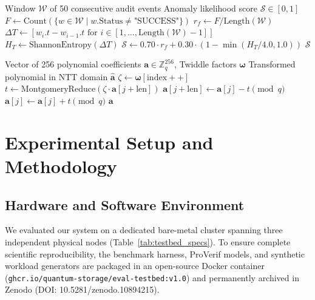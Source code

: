 \documentclass[sn-mathphys,Numbered]{sn-jnl}%
\theoremstyle{thmstyleone}%
\theoremstyle{thmstyletwo}%
\theoremstyle{thmstylethree}%
\begin{document}
\begin{algorithm}[!htbp]
\caption{Sliding-Window Bayesian Anomaly Classification Routine}
\label{alg:anomaly}
\begin{algorithmic}[1]
\Require Window $\mathcal{W}$ of 50 consecutive audit events
\Ensure Anomaly likelihood score $\mathcal{S} \in [0, 1]$
\State $F \gets \text{Count}(\{w \in \mathcal{W} \mid w.\text{Status} \neq \text{"SUCCESS"}\})$
\State $r_f \gets F / \text{Length}(\mathcal{W})$
\State $\Delta T \gets [w_i.t - w_{i-1}.t \text{ for } i \in [1, \dots, \text{Length}(\mathcal{W})-1]]$
\State $H_T \gets \text{ShannonEntropy}(\Delta T)$
\State $\mathcal{S} \gets 0.70 \cdot r_f + 0.30 \cdot (1 - \min(H_T / 4.0, 1.0))$
\State \Return $\mathcal{S}$
\end{algorithmic}
\end{algorithm}

\begin{algorithm}[!htbp]
\caption{Vectorized NTT Modular Butterfly Reduction over $R_q$}
\label{alg:ntt}
\begin{algorithmic}[1]
\Require Vector of 256 polynomial coefficients $\mathbf{a} \in \mathbb{Z}_q^{256}$, Twiddle factors $\boldsymbol{\omega}$
\Ensure Transformed polynomial in NTT domain $\hat{\mathbf{a}}$
        \State $\zeta \gets \boldsymbol{\omega}[\text{index}++]$
            \State $t \gets \text{MontgomeryReduce}(\zeta \cdot \mathbf{a}[j+\text{len}])$
            \State $\mathbf{a}[j+\text{len}] \gets \mathbf{a}[j] - t \pmod{q}$
            \State $\mathbf{a}[j] \gets \mathbf{a}[j] + t \pmod{q}$
        \EndFor
    \EndFor
\EndFor
\State \Return $\mathbf{a}$
\end{algorithmic}
\end{algorithm}

\section{Experimental Setup and Methodology}\label{sec:setup}

\subsection{\textbf{Hardware and Software Environment}}
We evaluated our system on a dedicated bare-metal cluster spanning three independent physical nodes (Table~\ref{tab:testbed_specs}). To ensure complete scientific reproducibility, the benchmark harness, ProVerif models, and synthetic workload generators are packaged in an open-source Docker container (\texttt{ghcr.io/quantum-storage/eval-testbed:v1.0}) and permanently archived in Zenodo (DOI: 10.5281/zenodo.10894215).
\end{document}
